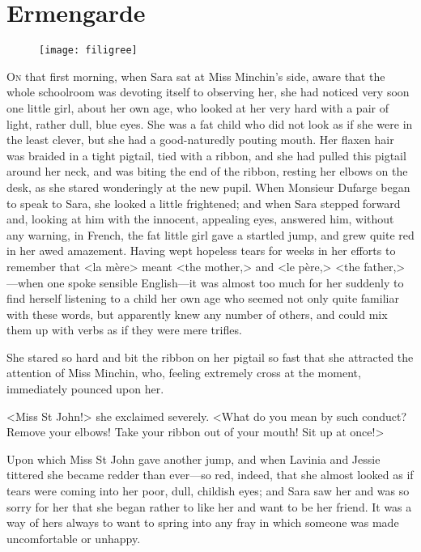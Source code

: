 \chapter{Ermengarde}

\begin{figure}[t!]
\centering
\texttt{[image: filigree]}
\end{figure}

\lettrine[lines=5]{O}{n} that first morning, when Sara sat at Miss Minchin's side, aware that the whole schoolroom was devoting itself to observing her, she had noticed very soon one little girl, about her own age, who looked at her very hard with a pair of light, rather dull, blue eyes. She was a fat child who did not look as if she were in the least clever, but she had a good-naturedly pouting mouth. Her flaxen hair was braided in a tight pigtail, tied with a ribbon, and she had pulled this pigtail around her neck, and was biting the end of the ribbon, resting her elbows on the desk, as she stared wonderingly at the new pupil. When Monsieur Dufarge began to speak to Sara, she looked a little frightened; and when Sara stepped forward and, looking at him with the innocent, appealing eyes, answered him, without any warning, in French, the fat little girl gave a startled jump, and grew quite red in her awed amazement. Having wept hopeless tears for weeks in her efforts to remember that <la mère> meant <the mother,> and <le père,> <the father,>—when one spoke sensible English—it was almost too much for her suddenly to find herself listening to a child her own age who seemed not only quite familiar with these words, but apparently knew any number of others, and could mix them up with verbs as if they were mere trifles.

She stared so hard and bit the ribbon on her pigtail so fast that she attracted the attention of Miss Minchin, who, feeling extremely cross at the moment, immediately pounced upon her.

<Miss St John!> she exclaimed severely. <What do you mean by such conduct? Remove your elbows! Take your ribbon out of your mouth! Sit up at once!>

Upon which Miss St John gave another jump, and when Lavinia and Jessie tittered she became redder than ever—so red, indeed, that she almost looked as if tears were coming into her poor, dull, childish eyes; and Sara saw her and was so sorry for her that she began rather to like her and want to be her friend. It was a way of hers always to want to spring into any fray in which someone was made uncomfortable or unhappy.

